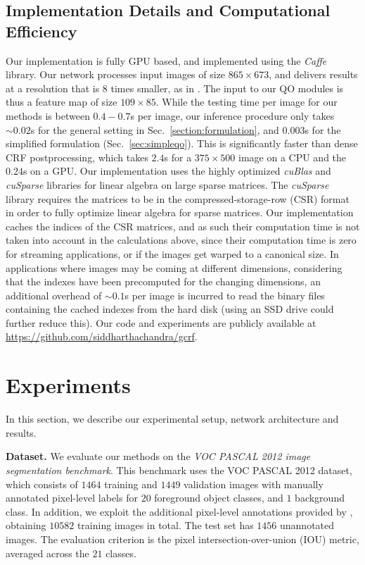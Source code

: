 \documentclass[runningheads]{llncs}
\begin{document}
\subsection{Implementation Details and Computational Efficiency}
Our implementation is fully GPU based, and implemented using the \emph{Caffe} library. Our network processes input images of size $865\times 673$, and delivers results at a resolution that is $8$ times smaller, as in \cite{deeplab1}.
The input to our QO modules is thus a feature map of size $109 \times 85$. While the testing time per image for our methods is between $0.4-0.7$s per image,
our inference procedure only takes $\sim 0.02$s for the general setting in Sec.~\ref{section:formulation}, and 
$0.003$s for the simplified formulation (Sec.~\ref{sec:simpleqo}). This is significantly faster than 
dense CRF postprocessing, which takes $2.4$s for a $375 \times 500$ image on a CPU and the $0.24$s on a GPU.
Our implementation uses the highly optimized \emph{cuBlas} and \emph{cuSparse} libraries for linear algebra on large sparse
matrices. The \emph{cuSparse} library requires the matrices to be in the compressed-storage-row (CSR) format in order to fully optimize linear
algebra for sparse matrices. Our implementation caches the indices of the CSR matrices, and as such their computation time is not taken into account 
in the calculations above, since their computation time is zero for streaming applications, or if the images get warped to a canonical size. 
In applications where images may be coming at different dimensions, considering that the
 indexes have been precomputed for the changing dimensions, an additional overhead of $\sim 0.1$s per image is incurred to read the binary files containing the cached 
 indexes from the hard disk (using an SSD drive could further reduce this). Our code and experiments are publicly available at \url{https://github.com/siddharthachandra/gcrf}.
 









\section{Experiments}
\label{sec:experiments}
In this section, we describe our experimental setup, network architecture and results.

\textbf{Dataset.} We evaluate our methods on the \emph{VOC PASCAL 2012 image segmentation benchmark}. This benchmark uses the VOC PASCAL 2012 dataset, which consists of
$1464$ training and $1449$ validation images with manually annotated pixel-level labels for $20$ foreground object classes, and $1$ background class. 
In addition, we exploit the additional
pixel-level annotations provided by \cite{hariharan}, obtaining $10582$ training images in total. The test set has $1456$ unannotated images. The evaluation
criterion is the pixel intersection-over-union (IOU) metric, averaged across the $21$ classes.
\end{document}
